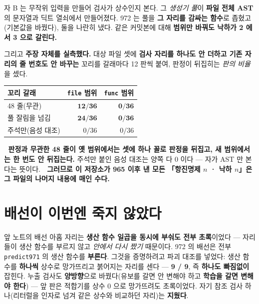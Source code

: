 \documentclass[10pt]{article}
\begin{document}
자 B 는 무작위 입력을 만들어 검사가 상수인지 본다. 그 \emph{생성기 풀}이
\textbf{파일 전체 AST} 의 문자열과 딕트 열쇠에서 만들어졌다. 972 는 풀을
\textbf{그 자리를 감싸는 함수}로 좁혔고(기본값을 바꿨다), 둘을 나란히 냈다.
같은 커밋본에 대해 \textbf{범위만 바꿔도 낙하가 2 에서 3 으로 갈린다.}

그리고 \textbf{주장 자체를 실측했다.} 대상 파일 셋에
\textbf{검사 자리를 하나도 안 더하고 기존 자리의 줄 번호도 안 바꾸는} 꼬리를
갈래마다 12 판씩 붙여, 판정이 뒤집히는 \emph{판의 비율}을 셌다.

\begin{center}\tsize
\begin{tabular}{lrr}
\toprule
꼬리 갈래 & \texttt{file} 범위 & \texttt{func} 범위 \\
\midrule
48 줄(무관) & $\mathbf{12/36}$ & $\mathbf{0/36}$ \\
풀 잘림을 넘김 & $\mathbf{24/36}$ & $\mathbf{0/36}$ \\
주석만(음성 대조) & $0/36$ & $0/36$ \\
\bottomrule
\end{tabular}
\end{center}

🔴 \textbf{판정과 무관한 48 줄이 옛 범위에서는 셋에 하나 꼴로 판정을 뒤집고, 새 범위에서는
한 번도 안 뒤집는다.} 주석만 붙인 음성 대조는 양쪽 다 0 이다 --- 자가 AST 만 본다는 뜻이다.
🔴 \textbf{그러므로 이 저장소가 965 이후 낸 모든 「항진명제 $n$ · 낙하 $n$」은
그 파일의 나머지 내용에 매인 수다.}


\section{배선이 이번엔 죽지 않았다}

앞 노트의 배선 아홉 자리는 \textbf{생산 함수 일곱을 동시에 부숴도 전부 초록}이었다 ---
자리들이 생산 함수를 부르지 않고 \emph{안에서 다시 짰기} 때문이다.
972 의 배선은 전부 \texttt{predict971} 의 생산 함수를 \textbf{부른다}. 그것을 증명하려고
파괴 대조를 넣었다: 생산 함수를 \textbf{하나씩} 상수로 망가뜨리고 붉어지는 자리를 센다 ---
\textbf{9 / 9}, 즉 \textbf{하나도 빠짐없이} 잡힌다.
누출 검사도 \textbf{양방향}으로 바꿨다(유보를 갈면 안 변해야 하고 \textbf{학습을 갈면 변해야 한다}) ---
앞 판은 적합기를 상수 0 으로 망가뜨려도 초록이었다.
자기 참조 검사 하나(리터럴을 인자로 넘겨 같은 상수와 비교하던 자리)는 \textbf{지웠다}.
\end{document}
